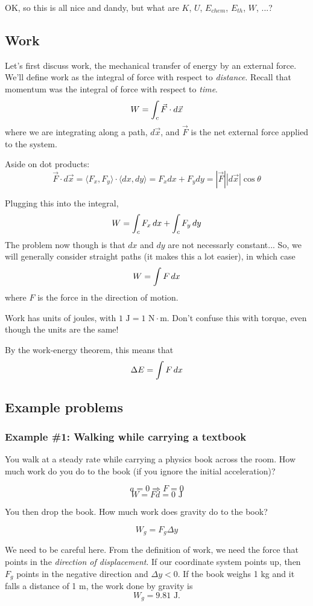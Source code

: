 OK, so this is all nice and dandy, but what are $K$, $U$, $E_{chem}$, $E_{th}$, $W$, $...$?

\subsection{Work}
Let's first discuss work, the mechanical transfer of energy by an external force. We'll define work as the integral of force with respect to \textit{distance}. Recall that momentum was the integral of force with respect to \textit{time}.
$$\displaystyle W= \int_{c}\vec{F}\cdot d\vec{x}$$
where we are integrating along a path, $d\vec{x}$, and $\vec F$ is the net external force applied to the system.

Aside on dot products:
$$\vec{F}\cdot d\vec{x} = \langle{F_x,F_y\rangle}\cdot\langle{dx,dy\rangle}= F_xdx + F_ydy = |\vec{F}||d\vec{x}|\cos\theta$$

\vspace{5cm}


Plugging this into the integral,
$$\displaystyle W = \int_c F_x\,dx + \int_c F_y\,dy$$
The problem now though is that $dx$ and $dy$ are not necessarly constant... So, we will generally consider straight paths (it makes this a lot easier), in which case
$$\displaystyle W=\int F\,dx$$
where $F$ is the force in the direction of motion.

Work has units of joules, with $1\mbox{ J}=1\mbox{ N}\cdot\mbox{m}$. Don't confuse this with torque, even though the units are the same!

By the work-energy theorem, this means that
$$\Delta E=\displaystyle\int F\,dx$$

\subsection{Example problems}
\subsubsection{Example \#1: Walking while carrying a textbook}
You walk at a steady rate while carrying a physics book across the room. How much work do you do to the book (if you ignore the initial acceleration)?

$$a=0\Rightarrow F=0$$
$$W=Fd=0\mbox{ J}$$

You then drop the book. How much work does gravity do to the book?

$$W_g=F_g\Delta{y}$$

We need to be careful here. From the definition of work, we need the force that points in the \textit{direction of displacement}. If our coordinate system points up, then $F_g$ points in the negative direction and $\Delta{y}<0$. If the book weighs 1 kg and it falls a distance of 1 m, the work done by gravity is 
$$W_g=9.81\mbox{ J}.$$


